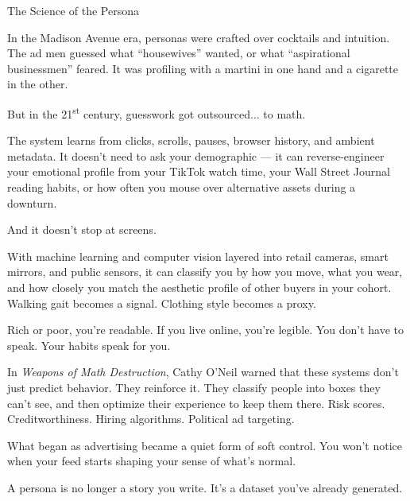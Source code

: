\medskip

\begin{HistoricalSidebar}{The Science of the Persona}

  In the Madison Avenue era, personas were crafted over cocktails and intuition.  
  The ad men guessed what “housewives” wanted, or what “aspirational businessmen” feared.  
  It was profiling with a martini in one hand and a cigarette in the other.

  \medskip
  
  But in the 21\textsuperscript{st} century, guesswork got outsourced... to math.
  
  \medskip
  
  The system learns from clicks, scrolls, pauses, browser history, and ambient metadata.  
  It doesn’t need to ask your demographic — it can reverse-engineer your emotional profile from your TikTok watch time,  
  your Wall Street Journal reading habits, or how often you mouse over alternative assets during a downturn.

  \medskip
  
  And it doesn’t stop at screens.

  \medskip
  
  With machine learning and computer vision layered into retail cameras, smart mirrors, and public sensors,  
  it can classify you by how you move, what you wear, and how closely you match the aesthetic profile of other buyers 
  in your cohort.  
  Walking gait becomes a signal. Clothing style becomes a proxy.

  \medskip
  
  Rich or poor, you’re readable.  
  If you live online, you’re legible.  
  You don’t have to speak. Your habits speak for you.
  
  \medskip
  
  In \textit{Weapons of Math Destruction}, Cathy O’Neil warned that these systems don’t just predict behavior.  
  They reinforce it. They classify people into boxes they can’t see, and then optimize their experience  
  to keep them there. Risk scores. Creditworthiness. Hiring algorithms. Political ad targeting.
  
  \medskip
  
  What began as advertising became a quiet form of soft control.  You won’t notice when your feed starts 
  shaping your sense of what’s normal.
  
  \medskip
  
  A persona is no longer a story you write.  
  It’s a dataset you’ve already generated.
  
\end{HistoricalSidebar}
  
